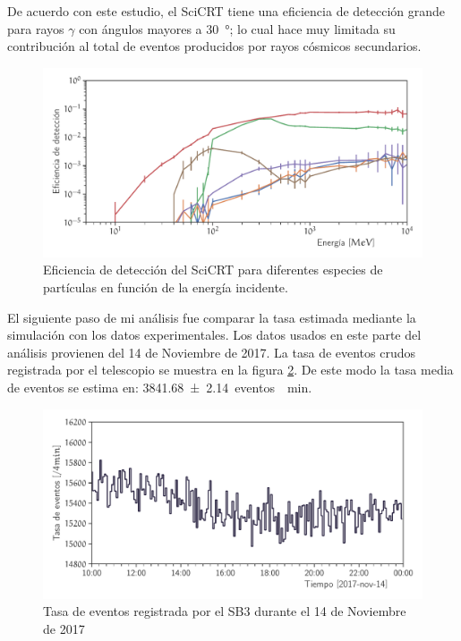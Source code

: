De acuerdo con este estudio, el SciCRT tiene una eficiencia de detección grande para rayos $\gamma$ con ángulos mayores a \SI{30}{\degree}; lo cual hace muy limitada su contribución al total de eventos producidos por rayos cósmicos secundarios.

\begin{figure}
        \centering
        \includegraphics[width=\textwidth]{scibar-efficiency.pdf}
        \caption{Eficiencia de detección del SciCRT para diferentes especies de partículas en función de la energía incidente.}
        \label{fig:total-efficiency}
\end{figure}

El siguiente paso de mi análisis fue comparar la tasa estimada mediante la simulación con los datos experimentales. Los datos usados en este parte del análisis provienen del \num{14} de Noviembre de \num{2017}. La tasa de eventos crudos registrada por el telescopio se muestra en la figura \ref{fig:neutron-1pix}. De este modo la tasa media de eventos se estima en: \SI{3841.68(214)}{eventos \per\minute}.

\begin{figure}
        \centering
        \includegraphics[width=\textwidth]{neutron-171114-1pix.pdf}
        \caption{Tasa de eventos registrada por el SB3 durante el \num{14} de Noviembre de \num{2017}}
        \label{fig:neutron-1pix}
\end{figure}

